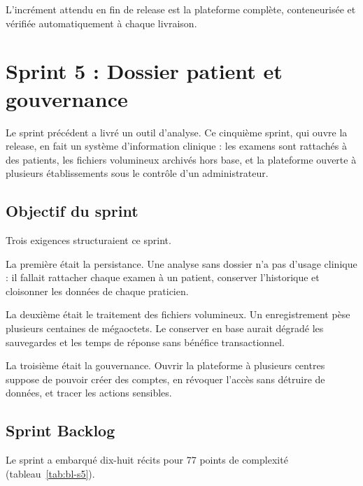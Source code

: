 L'incrément attendu en fin de release est la plateforme complète, conteneurisée et vérifiée
automatiquement à chaque livraison.

\section{Sprint 5 : Dossier patient et gouvernance}
\label{sec:sprint5}

Le sprint précédent a livré un outil d'analyse. Ce cinquième sprint, qui ouvre la release,
en fait un système d'information clinique : les examens sont rattachés à des patients, les
fichiers volumineux archivés hors base, et la plateforme ouverte à plusieurs établissements
sous le contrôle d'un administrateur.

\subsection{Objectif du sprint}

Trois exigences structuraient ce sprint.

La première était la persistance. Une analyse sans dossier n'a pas d'usage
clinique : il fallait rattacher chaque examen à un patient, conserver l'historique et
cloisonner les données de chaque praticien.

La deuxième était le traitement des fichiers volumineux. Un enregistrement pèse
plusieurs centaines de mégaoctets. Le conserver en base aurait dégradé les sauvegardes et
les temps de réponse sans bénéfice transactionnel.

La troisième était la gouvernance. Ouvrir la plateforme à plusieurs centres
suppose de pouvoir créer des comptes, en révoquer l'accès sans détruire de données, et
tracer les actions sensibles.

\subsection{Sprint Backlog}

Le sprint a embarqué dix-huit récits pour 77 points de complexité
(tableau~\ref{tab:bl-s5}).

